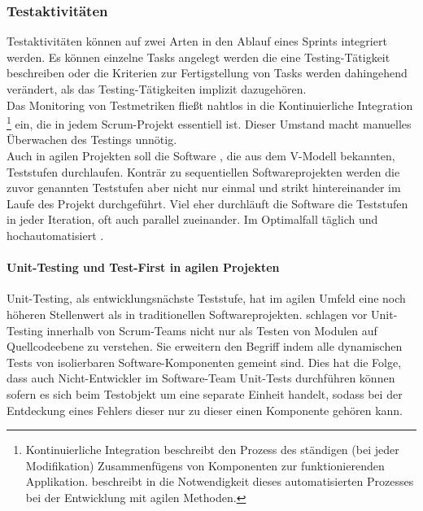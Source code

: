 \subsubsection{Testaktivitäten}
Testaktivitäten können auf zwei Arten in den Ablauf eines Sprints integriert werden. Es können einzelne Tasks  angelegt werden die eine Testing-Tätigkeit beschreiben oder die Kriterien zur Fertigstellung von Tasks werden dahingehend verändert, als das Testing-Tätigkeiten  implizit dazugehören.\\
Das Monitoring von Testmetriken fließt nahtlos in die Kontinuierliche Integration \footnote{Kontinuierliche Integration beschreibt den Prozess des ständigen (bei jeder Modifikation) Zusammenfügens von Komponenten zur funktionierenden Applikation. \citeauthor{linz_testing_2014} beschreibt in \cite{linz_testing_2014} die Notwendigkeit dieses automatisierten Prozesses bei der Entwicklung mit agilen Methoden.} ein, die in jedem Scrum-Projekt essentiell ist. Dieser Umstand macht manuelles Überwachen des Testings unnötig\cite{linz_testing_2014}.\\
Auch in agilen Projekten soll die Software , die aus dem V-Modell bekannten, Teststufen durchlaufen. Konträr zu sequentiellen Softwareprojekten werden die zuvor genannten Teststufen aber nicht nur einmal und strikt hintereinander im Laufe des Projekt durchgeführt. Viel eher durchläuft die Software die Teststufen in jeder Iteration, oft auch parallel zueinander. Im Optimalfall täglich und hochautomatisiert \cite{linz_testing_2014}.

\paragraph{Unit-Testing und Test-First in agilen Projekten}   
Unit-Testing, als entwicklungsnächste Teststufe, hat im agilen Umfeld eine noch höheren Stellenwert als in traditionellen Softwareprojekten. \citeauthor{spillner_software_2014} schlagen vor Unit-Testing innerhalb von Scrum-Teams nicht nur als Testen von Modulen auf Quellcodeebene zu verstehen. Sie erweitern den Begriff indem alle dynamischen Tests von isolierbaren Software-Komponenten gemeint sind. Dies hat die Folge, dass auch Nicht-Entwickler im Software-Team Unit-Tests  durchführen können sofern es sich beim Testobjekt um eine separate Einheit handelt, sodass bei der Entdeckung eines Fehlers dieser nur zu dieser einen Komponente gehören kann.\\

